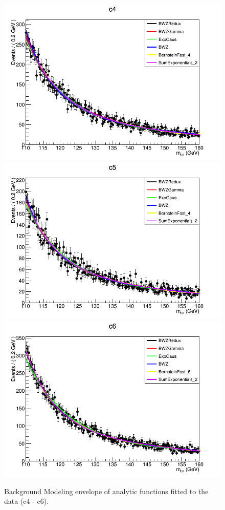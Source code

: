 \begin{figure}[htbp]
  \centering
  \includegraphics[width=0.65\linewidth]{figures/ch_higgs/backgroundmodel/uf_bdt/backgroundFits__c4__bkgModels.png}\\
  \includegraphics[width=0.65\linewidth]{figures/ch_higgs/backgroundmodel/uf_bdt/backgroundFits__c5__bkgModels.png}\\
  \includegraphics[width=0.65\linewidth]{figures/ch_higgs/backgroundmodel/uf_bdt/backgroundFits__c6__bkgModels.png}
  \caption{Background Modeling envelope of analytic functions fitted to the data (c4 - c6).}
  \label{fig:higgs_bmodel_bdtc4c6}
\end{figure}

